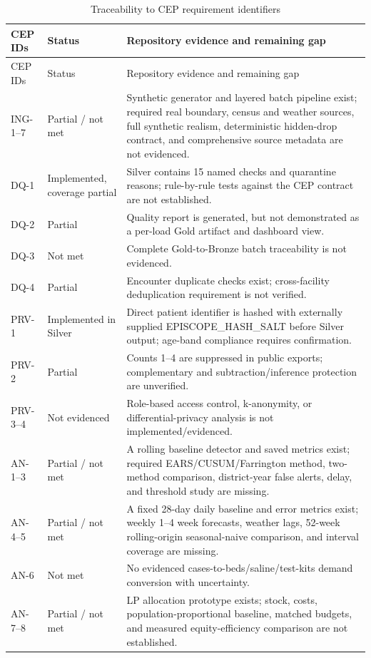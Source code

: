 ﻿\documentclass[conference]{IEEEtran}
\begin{document}
\small
\begin{longtable}{p{1.7cm}p{2.4cm}p{11.7cm}}
\caption{Traceability to CEP requirement identifiers}\\
\toprule CEP IDs & Status & Repository evidence and remaining gap \\
\midrule\endfirsthead
\toprule CEP IDs & Status & Repository evidence and remaining gap \\
\midrule\endhead
ING-1--7 & Partial / not met & Synthetic generator and layered batch pipeline exist; required real boundary, census and weather sources, full synthetic realism, deterministic hidden-drop contract, and comprehensive source metadata are not evidenced. \\
DQ-1 & Implemented, coverage partial & Silver contains 15 named checks and quarantine reasons; rule-by-rule tests against the CEP contract are not established. \\
DQ-2 & Partial & Quality report is generated, but not demonstrated as a per-load Gold artifact and dashboard view. \\
DQ-3 & Not met & Complete Gold-to-Bronze batch traceability is not evidenced. \\
DQ-4 & Partial & Encounter duplicate checks exist; cross-facility deduplication requirement is not verified. \\
PRV-1 & Implemented in Silver & Direct patient identifier is hashed with externally supplied EPISCOPE\_HASH\_SALT before Silver output; age-band compliance requires confirmation. \\
PRV-2 & Partial & Counts 1--4 are suppressed in public exports; complementary and subtraction/inference protection are unverified. \\
PRV-3--4 & Not evidenced & Role-based access control, k-anonymity, or differential-privacy analysis is not implemented/evidenced. \\
AN-1--3 & Partial / not met & A rolling baseline detector and saved metrics exist; required EARS/CUSUM/Farrington method, two-method comparison, district-year false alerts, delay, and threshold study are missing. \\
AN-4--5 & Partial / not met & A fixed 28-day daily baseline and error metrics exist; weekly 1--4 week forecasts, weather lags, 52-week rolling-origin seasonal-naive comparison, and interval coverage are missing. \\
AN-6 & Not met & No evidenced cases-to-beds/saline/test-kits demand conversion with uncertainty. \\
AN-7--8 & Partial / not met & LP allocation prototype exists; stock, costs, population-proportional baseline, matched budgets, and measured equity-efficiency comparison are not established. \\

\end{longtable}
\end{document}
